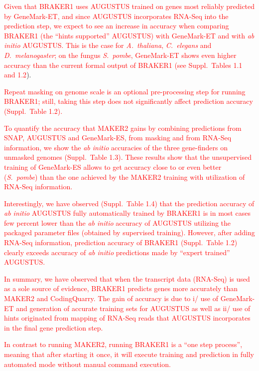 \documentclass{bioinfo}
\begin{document}
\textcolor{red}{Given that BRAKER1 uses AUGUSTUS trained on genes most reliably predicted by GeneMark-ET, and since AUGUSTUS incorporates RNA-Seq into the prediction step, we expect to see an increase in accuracy when comparing BRAKER1 (the ``hints supported'' AUGUSTUS) with GeneMark-ET and with \textit{ab initio} AUGUSTUS. This is the case for \textit{A.~thaliana}, \textit{C.~elegans} and \textit{D.~melanogaster}; on the fungus \textit{S.~pombe}, GeneMark-ET shows even higher accuracy than the current formal output of BRAKER1 (see Suppl.~Tables 1.1 and 1.2}). 

\textcolor{red}{Repeat masking on genome scale is an optional pre-processing step for running BRAKER1; still, taking this step does not significantly affect prediction accuracy (Suppl.~Table 1.2).}

\textcolor{red}{To quantify the accuracy that MAKER2 gains by combining predictions from SNAP, AUGUSTUS and GeneMark-ES, from masking and from RNA-Seq information, we show the \textit{ab initio} accuracies of the three gene-finders on unmasked genomes (Suppl.~Table 1.3). These results show that the unsupervised training of GeneMark-ES allows to get accuracy close to or even better (\textit{S.~pombe}) than the one achieved by the MAKER2 training with utilization of RNA-Seq information.}

\textcolor{red}{Interestingly, we have observed (Suppl.~Table 1.4) that the prediction accuracy of \textit{ab initio} AUGUSTUS fully automatically trained by BRAKER1 is in most cases few percent lower than the \textit{ab initio} accuracy of AUGUSTUS utilizing the packaged parameter files (obtained by supervised training). However, after adding RNA-Seq information, prediction accuracy of BRAKER1 (Suppl.~Table 1.2) clearly exceeds accuracy of \textit{ab initio} predictions made by ``expert trained'' AUGUSTUS.}

\textcolor{red}{In summary, we have observed that when the transcript data (RNA-Seq) is used as a sole source of evidence, BRAKER1 predicts genes more accurately than MAKER2 and CodingQuarry. The gain of accuracy is due to i/ use of GeneMark-ET and generation of accurate training sets for AUGUSTUS as well as ii/ use of hints originated from mapping of RNA-Seq reads that AUGUSTUS incorporates in the final gene prediction step.}

\textcolor{red}{In contrast to running MAKER2, running BRAKER1 is a ``one step process'', meaning that after starting it once, it will execute training and prediction in fully automated mode without manual command execution.}
\end{document}
